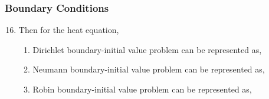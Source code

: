 \documentclass[10pt,compress,handout,ignorenonframetext]{beamer}
\begin{document}
\begin{frame}
 \frametitle{Boundary Conditions} 
 \begin{enumerate}
   \setcounter{enumi}{15}     
   \item <1-> Then for the heat equation, 
      \begin{enumerate}
        \item <2-> Dirichlet boundary-initial value problem can be represented as,
        \item <3-> Neumann boundary-initial value problem can be represented as,
        \item <4-> Robin boundary-initial value problem can be represented as,
  
      \end{enumerate}   
 \end{enumerate}   
 
\end{frame}
\end{document}
